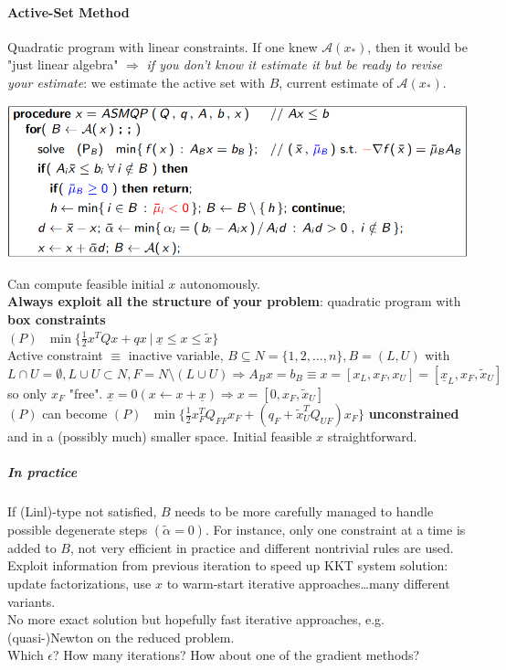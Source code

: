 \documentclass[10pt]{report}
\begin{document}
\paragraph{Active-Set Method} Quadratic program with linear constraints. If one knew $\mathscr{A}(x_*)$, then it would be "just linear algebra" $\Rightarrow$ \textit{if you don't know it estimate it but be ready to revise your estimate}: we estimate the active set with $B$, current estimate of $\mathscr{A}(x_*)$.
\begin{center}
	\includegraphics[scale=0.75]{10.png}
\end{center}
Can compute feasible initial $x$ autonomously.\\
\textbf{Always exploit all the structure of your problem}: quadratic program with \textbf{box constraints}\\$(P)\:\:\:\min\{\frac{1}{2}x^TQx+qx\:|\:\underline{x}\leq x\leq \tilde{x}\}$\\
Active constraint $\equiv$ inactive variable, $B\subseteq N=\{1,2,\ldots,n\}, B = (L,U)$ with $L\cap U=\emptyset, L\cup U \subset N, F = N\setminus (L\cup U)\Rightarrow A_Bx=b_B \equiv x = [x_L, x_F, x_U]=[\underline{x}_L, x_F, \tilde{x}_U]$ so only $x_F$ "free". $\underline{x} = 0 (x\leftarrow x+\underline{x})\Rightarrow x=[0, x_F, \tilde{x}_U]$\\
$(P)$ can become $(P)\:\:\:\min\{\frac{1}{2}x_F^TQ_{FF}x_F+(q_F+\tilde{x}_U^TQ_{UF})x_F\}$ \textbf{unconstrained} and in a (possibly much) smaller space. Initial feasible $x$ straightforward.
\subparagraph{In practice} If (Linl)-type not satisfied, $B$ needs to be more carefully managed to handle possible degenerate steps $(\tilde{\alpha}=0)$. For instance, only one constraint at a time is added to $B$, not very efficient in practice and different nontrivial rules are used.\\
Exploit information from previous iteration to speed up KKT system solution: update factorizations, use $x$ to warm-start iterative approaches\ldots many different variants.\\
No more exact solution but hopefully fast iterative approaches, e.g. (quasi-)Newton on the reduced problem.\\
Which $\epsilon$? How many iterations? How about one of the gradient methods?
\end{document}
